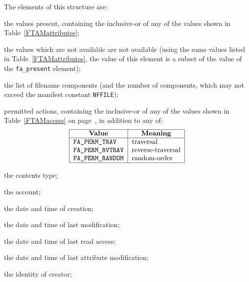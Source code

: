 The elements of this structure are:
\begin{describe}
\item[\verb"fa\_present":] the values present,
containing the inclusive-or of any of the values shown in
Table~\ref{FTAMattributes};

\item[\verb"fa\_novalue":] the values which are not available are not available
(using the same values listed in Table~\ref{FTAMattributes},
the value of this element is a subset of the value of the \verb"fa_present"
element);

\item[\verb"fa\_files"/\verb"fa\_nfile":] the list of filename components
(and the number of components, which may not exceed
the manifest constant \verb"NFFILE");

\item[\verb"fa\_permitted":] permitted actions,
containing the inclusive-or of any of the values shown in
Table~\ref{FTAMaccess} on page~\pageref{FTAMaccess},
in addition to any of:
\[\begin{tabular}{|l|l|}
\hline
    \multicolumn{1}{|c|}{\bf Value}&
		\multicolumn{1}{c|}{\bf Meaning}\\
\hline
    \tt FA\_PERM\_TRAV&		traversal\\
    \tt FA\_PERM\_RVTRAV&	reverse-traversal\\
    \tt FA\_PERM\_RANDOM&	random-order\\
\hline
\end{tabular}\]

\item[\verb"fa\_contents"/\verb"fa\_parameter":] the contents type;

\item[\verb"fa\_account":] the account;

\item[\verb"fa\_date\_create":] the date and time of creation;

\item[\verb"fa\_date\_modify":] the date and time of last modification;

\item[\verb"fa\_date\_read":] the date and time of last read access;

\item[\verb"fa\_date\_attribute":] the date and time of last attribute
modification;

\item[\verb"fa\_id\_create":] the identity of creator;


\end{describe}
